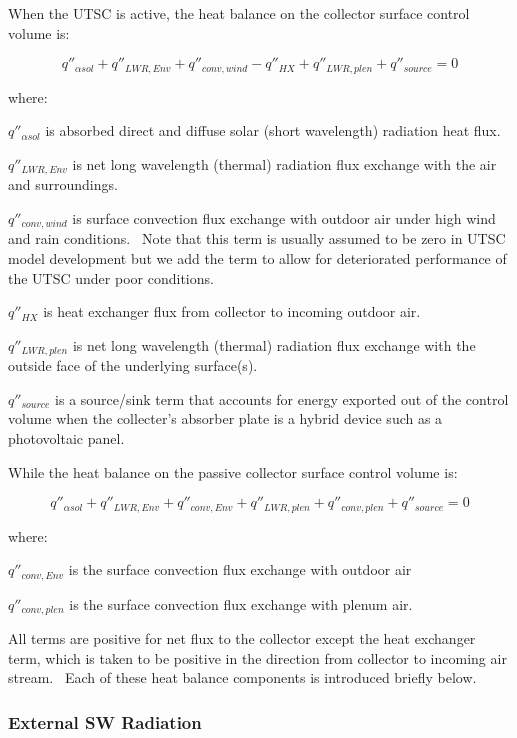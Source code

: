 When the UTSC is active, the heat balance on the collector surface control volume is:

\begin{equation}
{q''_{\alpha sol}} + {q''_{LWR,Env}} + {q''_{conv,wind}} - {q''_{HX}} + {q''_{LWR,plen}} + {q''_{source}} = 0
\label{eq:SolarCollectorHeatBalance718}
\end{equation}

where:

\(q''_{\alpha sol}\) is absorbed direct and diffuse solar (short wavelength) radiation heat flux.

\({q''_{LWR,Env}}\) is net long wavelength (thermal) radiation flux exchange with the air and surroundings.

\({q''_{conv,wind}}\) is surface convection flux exchange with outdoor air under high wind and rain conditions.~ Note that this term is usually assumed to be zero in UTSC model development but we add the term to allow for deteriorated performance of the UTSC under poor conditions.

\(q''_{HX}\) is heat exchanger flux from collector to incoming outdoor air.

\(q''_{LWR,plen}\) is net long wavelength (thermal) radiation flux exchange with the outside face of the underlying surface(s).

\({q''_{source}}\) is a source/sink term that accounts for energy exported out of the control volume when the collecter's absorber plate is a hybrid device such as a photovoltaic panel.

While the heat balance on the passive collector surface control volume is:

\begin{equation}
{q''_{\alpha sol}} + {q''_{LWR,Env}} + {q''_{conv,Env}} + {q''_{LWR,plen}} + {q''_{conv,plen}} + {q''_{source}} = 0
\end{equation}

where:

\(q''_{conv,Env}\) is the surface convection flux exchange with outdoor air

\(q''_{conv,plen}\) is the surface convection flux exchange with plenum air.

All terms are positive for net flux to the collector except the heat exchanger term, which is taken to be positive in the direction from collector to incoming air stream.~ Each of these heat balance components is introduced briefly below.

\subsubsection{External SW Radiation}\label{external-sw-radiation-000}

